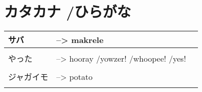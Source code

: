 \documentclass{article}
\begin{document}

\part*{カタカナ /ひらがな}
\begin{tabular}{ p{3cm} | l l }
サバ    &--> makrele \\ \hline\\[-1em]
やった  &--> hooray /yowzer! /whoopee! /yes! \\ \hline\\[-1em]
ジャガイモ &--> potato \\ \hline\\[-1em]
\end{tabular}
\end{document}

